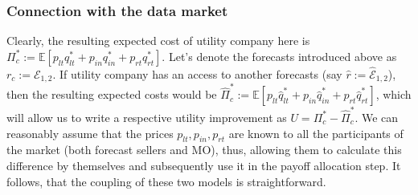 \documentclass{article}
\begin{document}
\subsubsection{Connection with the data market}
Clearly, the resulting expected cost of utility company here is $\Pi^{\ast}_c := \mathbb{E}[p_{lt} q^{\ast}_{lt} + p_{in} q^{\ast}_{in} + p_{rt} q^{\ast}_{rt}]$. Let's denote the forecasts introduced above as $r_c := \mathcal{E}_{1,2}$. If utility company has an access to another forecasts (say $\hat{r} := \hat{\mathcal{E}}_{1,2}$), then the resulting expected costs would be $\hat{\Pi}^{\ast}_c := \mathbb{E}[p_{lt} \hat{q}^{\ast}_{lt} + p_{in} \hat{q}^{\ast}_{in} + p_{rt} \hat{q}^{\ast}_{rt}]$, which will allow us to write a respective utility improvement as $U = \Pi^{\ast}_c - \hat{\Pi}^{\ast}_c$. We can reasonably assume that the prices $p_{lt}, p_{in}, p_{rt}$ are known to all the participants of the market (both forecast sellers and MO), thus, allowing them to calculate this difference by themselves and subsequently use it in the payoff allocation step. It follows, that the coupling of these two models is straightforward.
\end{document}
